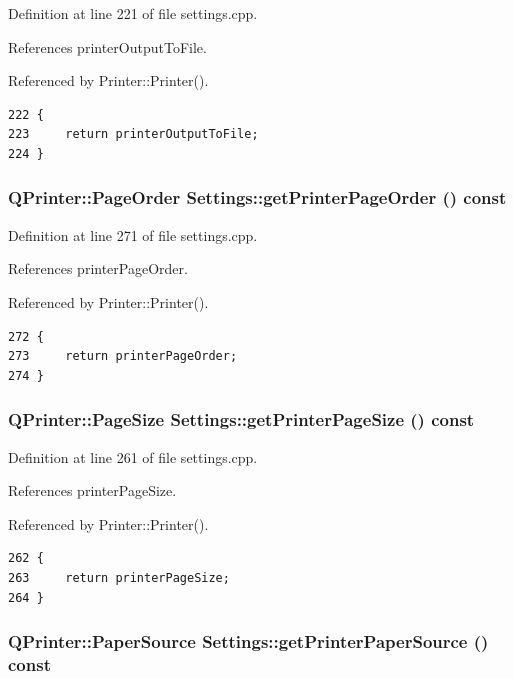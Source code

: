 Definition at line 221 of file settings.cpp.

References printer\-Output\-To\-File.

Referenced by Printer::Printer().

\footnotesize\begin{verbatim}222 {
223     return printerOutputToFile;
224 }
\end{verbatim}\normalsize 


\hypertarget{classSettings_a31}{
\subsubsection[getPrinterPageOrder]{\setlength{\rightskip}{0pt plus 5cm}QPrinter::Page\-Order Settings::get\-Printer\-Page\-Order () const}}
\label{classSettings_a31}


Definition at line 271 of file settings.cpp.

References printer\-Page\-Order.

Referenced by Printer::Printer().

\footnotesize\begin{verbatim}272 {
273     return printerPageOrder;
274 }
\end{verbatim}\normalsize 


\hypertarget{classSettings_a29}{
\subsubsection[getPrinterPageSize]{\setlength{\rightskip}{0pt plus 5cm}QPrinter::Page\-Size Settings::get\-Printer\-Page\-Size () const}}
\label{classSettings_a29}


Definition at line 261 of file settings.cpp.

References printer\-Page\-Size.

Referenced by Printer::Printer().

\footnotesize\begin{verbatim}262 {
263     return printerPageSize;
264 }
\end{verbatim}\normalsize 


\hypertarget{classSettings_a35}{
\subsubsection[getPrinterPaperSource]{\setlength{\rightskip}{0pt plus 5cm}QPrinter::Paper\-Source Settings::get\-Printer\-Paper\-Source () const}}
\label{classSettings_a35}


